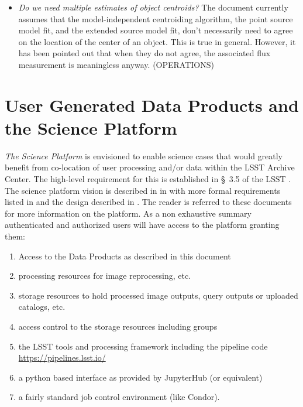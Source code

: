 \documentclass[SE,lsstdraft,toc]{lsstdoc}
\begin{document}
\begin{openissues}
\begin{itemize}
    \item \emph{Do we need multiple estimates of object centroids?} The document currently assumes that the model-independent centroiding algorithm, the point source model fit, and the extended source model fit, don't necessarily need to agree on the location of the center of an object. This is true in general. However, it has been pointed out that when they do not agree, the associated flux measurement is meaningless anyway. (OPERATIONS)

\end{itemize}
\end{openissues}

\clearpage

\section{User Generated Data Products and the Science Platform}
\label{sec:level3}

\emph{The Science Platform} is  envisioned to enable science cases that would greatly benefit from co-location of user processing and/or data within the LSST Archive Center. The high-level requirement for this is established in \S~3.5 of the LSST \SRD.
The science platform vision is described in in 
with more formal requirements listed in  and the design described in .
The reader is referred to these documents for more information on the platform. As a non exhaustive summary
authenticated and authorized users will have access to the platform granting them:
\begin{enumerate}
    \item Access to the Data Products  as described in this document
    \item processing resources for image reprocessing, etc.
    \item storage resources to hold processed image outputs, query outputs or uploaded catalogs, etc.
    \item access control to the storage resources including groups  
    \item the LSST tools and processing  framework including the pipeline code \url{https://pipelines.lsst.io/}
    \item a python based interface as provided by JupyterHub (or equivalent)
     \item a fairly standard job control environment (like Condor).
\end{enumerate}
\end{document}
